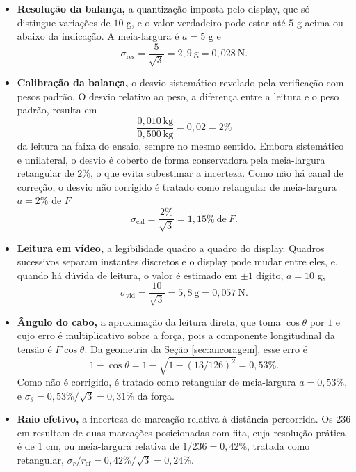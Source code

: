 \begin{itemize}
    \item \textbf{Resolução da balança,} a quantização imposta pelo display, que só distingue
    variações de $10$ g, e o valor verdadeiro pode estar até $5$ g acima ou abaixo
    da indicação. A meia-largura é $a = 5$ g e
    \[
    \sigma_{\mathrm{res}} = \frac{5}{\sqrt{3}} = 2{,}9\ \mathrm{g} = 0{,}028\ \mathrm{N}.
    \] 
    \item \textbf{Calibração da balança,} o desvio sistemático revelado pela verificação com
    pesos padrão. O desvio relativo ao peso, a diferença entre a leitura e o peso padrão,
    resulta em
    \[
    \frac{0{,}010\ \mathrm{kg}}{0{,}500\ \mathrm{kg}} = 0{,}02 = 2\%
    \]
    da leitura na faixa do ensaio, sempre no mesmo sentido. Embora sistemático e
    unilateral, o desvio é coberto de forma conservadora pela meia-largura retangular de
    $2\%$, o que evita subestimar a incerteza. Como não há canal de correção,
    o desvio não corrigido é tratado como retangular de meia-largura $a = 2\%$ de $F$
    \[
    \sigma_{\mathrm{cal}} = \frac{2\%}{\sqrt{3}} = 1{,}15\% \ \text{de}\ F.
    \]
    \item \textbf{Leitura em vídeo,} a legibilidade quadro a quadro do display. Quadros
    sucessivos separam instantes discretos e o display pode mudar entre eles, e,
    quando há dúvida de leitura, o valor é estimado em $\pm 1$ dígito, $a = 10$ g,
    \[
    \sigma_{\mathrm{vid}} = \frac{10}{\sqrt{3}} = 5{,}8\ \mathrm{g} = 0{,}057\ \mathrm{N}.
    \]
    \item \textbf{Ângulo do cabo,} a aproximação da leitura direta, que toma $\cos\theta$
    por $1$ e cujo erro é multiplicativo sobre a força, pois a componente longitudinal da
    tensão é $F\cos\theta$. Da geometria da Seção \ref{sec:ancoragem}, esse erro é
    \[
    1 - \cos\theta = 1 - \sqrt{1 - (13/126)^2} = 0{,}53\%.
    \]
    Como não é corrigido, é tratado como retangular de meia-largura $a = 0{,}53\%$,
    e $\sigma_{\theta} = 0{,}53\%/\sqrt{3} = 0{,}31\%$ da força.
    \item \textbf{Raio efetivo,} a incerteza de marcação relativa à distância percorrida.
    Os $236$ cm resultam de duas marcações posicionadas com fita, cuja resolução prática é
    de $1$ cm, ou meia-largura relativa de $1/236 = 0{,}42\%$, tratada como retangular,
    $\sigma_r/r_\mathrm{ef} = 0{,}42\%/\sqrt{3} = 0{,}24\%$.
\end{itemize}

